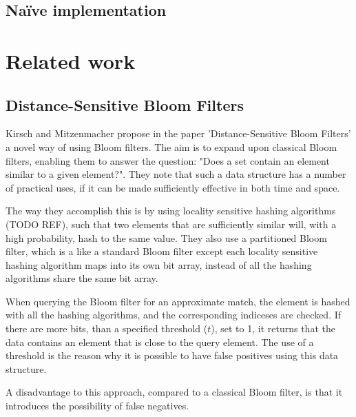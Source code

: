 \documentclass[a4paper,11pt]{article}
\begin{document}
\subsection{Naïve implementation}







\section{Related work} %

\subsection{Distance-Sensitive Bloom Filters}
Kirsch and Mitzenmacher propose in the paper 'Distance-Sensitive Bloom Filters'\cite{paper:harvard} a novel way of using Bloom filters. The aim is to expand upon classical Bloom filters, enabling them to answer the question: "Does a set contain an element similar to a given element?". They note that such a data structure has a number of practical uses, if it can be made sufficiently effective in both time and space.

The way they accomplish this is by using locality sensitive hashing algorithms (TODO REF), such that two elements that are sufficiently similar will, with a high probability, hash to the same value. They also use a partitioned Bloom filter, which is a like a standard Bloom filter except each locality sensitive hashing algorithm maps into its own bit array, instead of all the hashing algorithms share the same bit array.

When querying the Bloom filter for an approximate match, the element is hashed with all the hashing algorithms, and the corresponding indiceses are checked. If there are more bits, than a specified threshold ($t$), set to 1, it returns that the data contains an element that is close to the query element. The use of a threshold is the reason why it is possible to have false positives using this data structure.

A disadvantage to this approach, compared to a classical Bloom filter, is that it introduces the possibility of false negatives.

\end{document}

